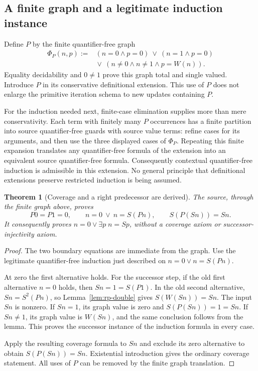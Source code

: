 \documentclass[11pt,letterpaper]{article}
\newtheorem{theorem}{Theorem}[section]
\theoremstyle{definition}\newtheorem{definition}[theorem]{Definition}
\theoremstyle{remark}\newtheorem{remark}[theorem]{Remark}
\begin{document}
\subsection{A finite graph and a legitimate induction instance}

Define $P$ by the finite quantifier-free graph
\[
\begin{split}
 \Phi_P(n,p):={}&(n=0\land p=0)\ \lor\ (n=1\land p=0)\\
 &{}\lor\ (n\ne0\land n\ne1\land p=W(n)).
\end{split}
\]
Equality decidability and $0\ne1$ prove this graph total and single
valued. Introduce $P$ in its conservative definitional extension.
This use of $P$ does not enlarge the primitive iteration schema to new
updates containing $P$.

For the induction needed next, finite-case elimination supplies more than
mere conservativity. Each term with finitely many $P$ occurrences has a
finite partition into source quantifier-free guards with source value
terms: refine cases for its arguments, and then use the three displayed
cases of $\Phi_P$. Repeating this finite expansion translates any
quantifier-free formula of the extension into an equivalent source
quantifier-free formula. Consequently contextual quantifier-free induction
is admissible in this extension. No general principle that definitional
extensions preserve restricted induction is being assumed.

\begin{theorem}[Coverage and a right predecessor are derived]
\label{thm:rp-coverage}
The source, through the finite graph above, proves
\[
 P0=P1=0,\qquad
 n=0\ \lor\ n=S(Pn),\qquad
 S(P(Sn))=Sn.
\]
It consequently proves $n=0\lor\exists p\;n=Sp$, without a coverage
axiom or successor-injectivity axiom.
\end{theorem}
\begin{proof}
The two boundary equations are immediate from the graph. Use the
legitimate quantifier-free induction just described on
$n=0\lor n=S(Pn)$.

At zero the first alternative holds. For the successor step, if the old
first alternative $n=0$ holds, then $Sn=1=S(P1)$. In the old second
alternative, $Sn=S^2(Pn)$, so Lemma~\ref{lem:rp-double} gives
$S(W(Sn))=Sn$. The input $Sn$ is nonzero. If $Sn=1$, its graph value
is zero and $S(P(Sn))=1=Sn$. If $Sn\ne1$, its graph value is $W(Sn)$,
and the same conclusion follows from the lemma. This proves the
successor instance of the induction formula in every case.

Apply the resulting coverage formula to $Sn$ and exclude its zero
alternative to obtain $S(P(Sn))=Sn$. Existential introduction gives the
ordinary coverage statement. All uses of $P$ can be removed by the
finite graph translation.
\end{proof}
\end{document}
